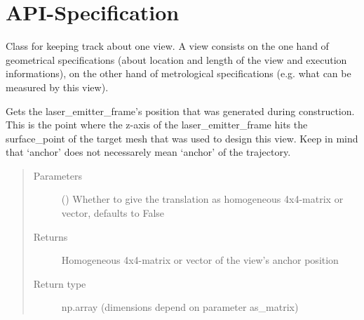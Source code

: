 \documentclass[letterpaper,10pt,english]{sphinxmanual}
\begin{document}
\section{API-Specification}
\label{\detokenize{module_view:api-specification}}\label{\detokenize{module_view:module-agiprobot_measurement.view}}

\begin{fulllineitems}
\label{\detokenize{module_view:agiprobot_measurement.view.View}}
Class for keeping track about one view.
A view consists on the one hand of geometrical specifications (about location and length of the view and execution informations), on the other
hand of metrological specifications (e.g. what can be measured by this view).

\begin{fulllineitems}
\label{\detokenize{module_view:agiprobot_measurement.view.View.get_anchor_position}}
Gets the laser\_emitter\_frame’s position that was generated during construction. This is the point where the z-axis of the laser\_emitter\_frame
hits the surface\_point of the target mesh that was used to design this view. Keep in mind that ‘anchor’ does not necessarely mean ‘anchor’ of the trajectory.
\begin{quote}\begin{description}
\item[{Parameters}] \leavevmode
{} (\sphinxstyleliteralemphasis{, }) \textendash{} Whether to give the translation as homogeneous 4x4-matrix or vector, defaults to False

\item[{Returns}] \leavevmode
Homogeneous 4x4-matrix or vector of the view’s anchor position

\item[{Return type}] \leavevmode
np.array (dimensions depend on parameter as\_matrix)

\end{description}\end{quote}


\end{fulllineitems}
\end{fulllineitems}
\end{document}
